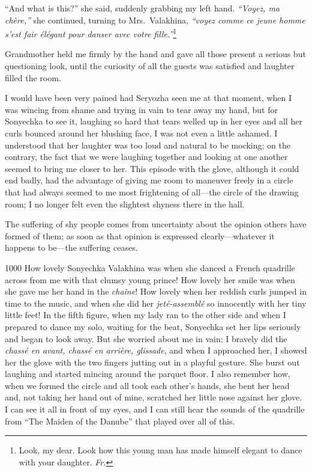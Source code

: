 ``And what is this?'' she said, suddenly grabbing my left hand. \textit{``Voyez, ma ch\`ere,''} she continued, turning to Mrs.~Valakhina, \textit{``voyez comme ce jeune homme s'est fair \'el\'egant pour danser avec votre fille.''}\footnote{Look, my dear. Look how this young man has made himself elegant to dance with your daughter. \textit{Fr.}} %

Grandmother held me firmly by the hand and gave all those present a serious but questioning look, until the curiosity of all the guests was satisfied and laughter filled the room. 

I would have been very pained had Seryozha seen me at that moment, when I was wincing from shame and trying in vain to tear away my hand, but for Sonyechka to see it, laughing so hard that tears welled up in her eyes and all her curls bounced around her blushing face, I was not even a little ashamed. I understood that her laughter was too loud and natural to be mocking; on the contrary, the fact that we were laughing together and looking at one another seemed to bring me closer to her. This episode with the glove, although it could end badly, had the advantage of giving me room to maneuver freely in a circle that had always seemed to me most frightening of all---the circle of the drawing room; I no longer felt even the slightest shyness there in the hall.

The suffering of shy people comes from uncertainty about the opinion others have formed of them; as soon as that opinion is expressed clearly---whatever it happens to be---the suffering ceases.

\begin{tolerant}{1000}
How lovely Sonyechka Valakhina was when she danced a French quadrille across from me with that clumsy young prince! How lovely her smile was when she gave me her hand in the \textit{cha\^ine}! How lovely when her reddish curls jumped in time to the music, and when she did her \textit{jet\'e-assembl\'e} so innocently with her tiny little feet! In the fifth figure, when my lady ran to the other side and when I prepared to dance my solo, waiting for the beat, Sonyechka set her lips seriously and began to look away. But she worried about me in vain: I bravely did the \textit{chass\'e en avant, chass\'e en arri\`ere, glissade}, and when I approached her, I showed her the glove with the two fingers jutting out in a playful gesture. She burst out laughing and started mincing around the parquet floor. I also remember how, when we formed the circle and all took each other's hands, she bent her head and, not taking her hand out of mine, scratched her little nose against her glove. I can see it all in front of my eyes, and I can still hear the sounds of the quadrille from ``The Maiden of the Danube'' that played over all of this.
\end{tolerant}

